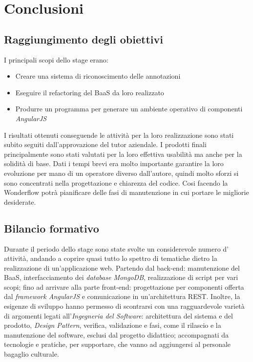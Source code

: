 \chapter{Conclusioni}
\label{cap:conclusioni}
\section{Raggiungimento degli obiettivi}
I principali scopi dello stage erano:
\begin{itemize}
\item Creare una sistema di riconoscimento delle annotazioni
\item Eseguire il \gls{refactoring} del \gls{BaaS} da loro realizzato
\item Produrre un programma per generare un ambiente operativo di componenti
 \textit{AngularJS}
\end{itemize}

I risultati ottenuti conseguende le attività per la loro realizzazione sono 
stati subito seguiti dall'approvazione del tutor aziendale. I prodotti finali
principalmente sono stati valutati per la loro effettiva usabilità ma anche
per la solidità di base. Dati i tempi brevi era molto importante garantire
la loro evoluzione per mano di un operatore diverso dall'autore, quindi molto
sforzi si sono concentrati nella progettazione e chiarezza del codice. Cosi 
facendo la Wonderflow potrà pianificare delle fasi di manutenzione in cui 
portare le migliorie desiderate.

\section{Bilancio formativo}
Durante il periodo dello stage sono state svolte un considerevole numero d'
attività, andando a coprire quasi tutto lo spettro di tematiche dietro la
realizzazione di un'applicazione web. Partendo dal \gls{back-end}: manutenzione
del \gls{BaaS}, interfacciamento dei \textit{database MongoDB}, realizzazione di
script per vari scopi; fino ad arrivare alla parte \gls{front-end}: 
progettazione per componenti offerta dal \textit{framework AngularJS} e
comunicazione in un'architettura \gls{REST}. Inoltre, la esigenze di sviluppo
hanno permesso di scontrarsi con una ragguardevole varietà di argomenti legati
all'\textit{Ingegneria del Software}: architettura del sistema e del prodotto, 
\textit{Design Pattern}, verifica, validazione e fasi, come il rilascio
e la manutenzione del software, esclusi dal progetto didattico; accompagnati
da tecnologie e pratiche, per supportare, che vanno ad aggiungersi al personale
bagaglio culturale.

